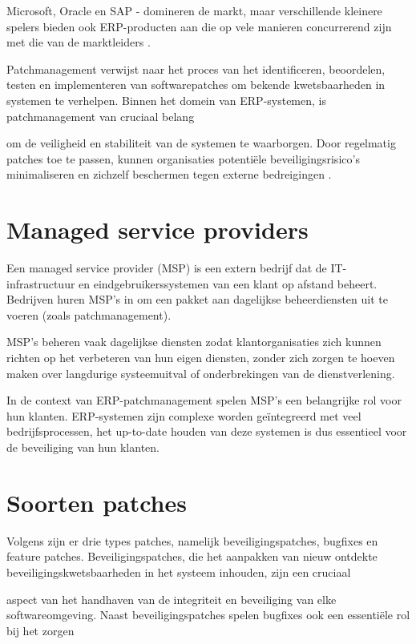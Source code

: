 Microsoft, Oracle en SAP - domineren de markt, maar verschillende kleinere spelers bieden ook ERP-producten aan die op vele manieren concurrerend zijn met die van de marktleiders \autocite{Pratt2023}.

Patchmanagement verwijst naar het proces van het identificeren, beoordelen, testen en implementeren van softwarepatches om bekende kwetsbaarheden in systemen te verhelpen. Binnen het domein van ERP-systemen, is patchmanagement van cruciaal belang

om de veiligheid en stabiliteit van de systemen te waarborgen. Door regelmatig patches toe te passen, kunnen organisaties potentiële beveiligingsrisico's minimaliseren en zichzelf beschermen tegen externe bedreigingen \autocite{Buenning2024}.

\section{Managed service providers}

Een managed service provider (MSP) is een extern bedrijf dat de IT-infrastructuur en eindgebruikerssystemen van een klant op afstand beheert. Bedrijven huren MSP's in om een pakket aan dagelijkse beheerdiensten uit te voeren (zoals patchmanagement).

MSP's beheren vaak dagelijkse diensten zodat klantorganisaties zich kunnen richten op het verbeteren van hun eigen diensten, zonder zich zorgen te hoeven maken over langdurige systeemuitval of onderbrekingen van de dienstverlening.

In de context van ERP-patchmanagement spelen MSP's een belangrijke rol voor hun klanten. ERP-systemen zijn complexe worden geïntegreerd met veel bedrijfsprocessen, het up-to-date houden van deze systemen is dus essentieel voor de beveiliging van hun klanten. \autocite{Gillis2021}

\section{Soorten patches}
Volgens \textcite{Buenning2024} zijn er drie types patches, namelijk beveiligingspatches, bugfixes en feature patches. Beveiligingspatches, die het aanpakken van nieuw ontdekte beveiligingskwetsbaarheden in het systeem inhouden, zijn een cruciaal
 
aspect van het handhaven van de integriteit en beveiliging van elke softwareomgeving. Naast beveiligingspatches spelen bugfixes ook een essentiële rol bij het zorgen 

